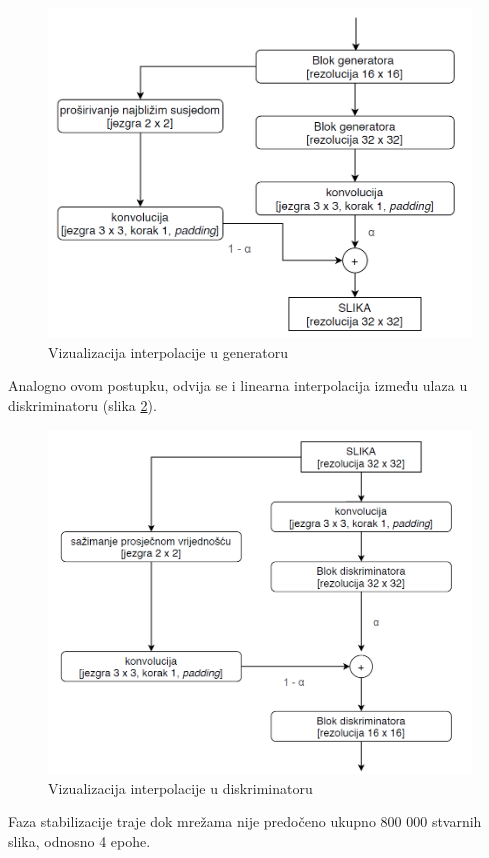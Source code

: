 \begin{figure}[h]
\centering
		\includegraphics[height=0.7\textwidth]{images/generator_interpolation.png}
\caption{Vizualizacija interpolacije u generatoru}
\label{gen_interpolation}
\end{figure}
 
Analogno ovom postupku, odvija se i linearna interpolacija između ulaza u diskriminatoru (slika \ref{disc_interpolation}). 

\begin{figure}[h]
\centering
		\includegraphics[height=0.7\textwidth]{images/discriminator_interpolation.png}
\caption{Vizualizacija interpolacije u diskriminatoru}
\label{disc_interpolation}
\end{figure}

Faza stabilizacije traje dok mrežama nije predočeno ukupno 800 000 stvarnih slika, odnosno 4 epohe.

